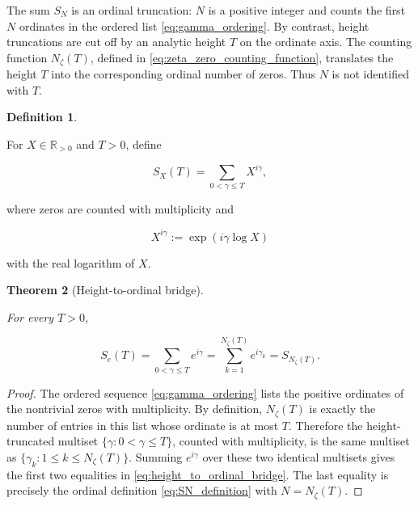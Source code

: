 \documentclass[11pt]{amsart}
\numberwithin{equation}{section}
\theoremstyle{plain}
\newtheorem{theorem}{Theorem}[section]
\theoremstyle{definition}
\newtheorem{definition}[theorem]{Definition}
\theoremstyle{remark}
\begin{document}
The sum \(S_N\) is an ordinal truncation: \(N\) is a positive integer
and counts the first \(N\) ordinates in the ordered list
\eqref{eq:gamma_ordering}. By contrast, height truncations are cut off by
an analytic height \(T\) on the ordinate axis. The counting function
\(N_\zeta(T)\), defined in \eqref{eq:zeta_zero_counting_function},
translates the height \(T\) into the corresponding ordinal number of
zeros. Thus \(N\) is not identified with \(T\).

\begin{definition}
\label{def:continuous_height_phase_sum}

For \(X\in\mathbb{R}_{>0}\) and \(T>0\), define

\begin{equation}
S_X(T)
=
\sum_{0<\gamma\leq T}X^{i\gamma},
\label{eq:continuous_height_phase_sum}
\end{equation}

where zeros are counted with multiplicity and

\begin{equation}
X^{i\gamma}:=\exp(i\gamma\log X)
\label{eq:continuous_power_real_log}
\end{equation}

with the real logarithm of \(X\).

\end{definition}

\begin{theorem}[Height-to-ordinal bridge]
\label{thm:height_to_ordinal_bridge}

For every \(T>0\),

\begin{equation}
S_e(T)
=
\sum_{0<\gamma\leq T}e^{i\gamma}
=
\sum_{k=1}^{N_\zeta(T)}e^{i\gamma_k}
=
S_{N_\zeta(T)}.
\label{eq:height_to_ordinal_bridge}
\end{equation}

\end{theorem}

\begin{proof}
The ordered sequence \eqref{eq:gamma_ordering} lists the positive
ordinates of the nontrivial zeros with multiplicity. By definition,
\(N_\zeta(T)\) is exactly the number of entries in this list whose
ordinate is at most \(T\). Therefore the height-truncated multiset
\(\{\gamma:0<\gamma\leq T\}\), counted with multiplicity, is the same
multiset as \(\{\gamma_k:1\leq k\leq N_\zeta(T)\}\). Summing
\(e^{i\gamma}\) over these two identical multisets gives the first two
equalities in \eqref{eq:height_to_ordinal_bridge}. The last equality is
precisely the ordinal definition \eqref{eq:SN_definition} with
\(N=N_\zeta(T)\).
\end{proof}
\end{document}
